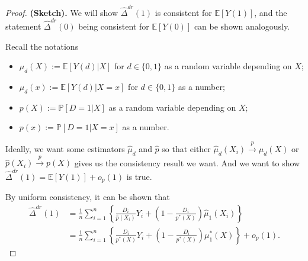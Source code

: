\documentclass[11pt,a4paper]{amsart}
\theoremstyle{plain}
\theoremstyle{definition}
\begin{document}
	\begin{proof}
		\textbf{(Sketch).} We will show $\hat{\Delta}^{dr}(1) $ is consistent for $\mathbb{E}[Y(1)]$, and the statement $\hat{\Delta}^{dr}(0) $ being consistent for $\mathbb{E}[Y(0)]$ can be shown analogously. \par 
		Recall the notations
		\begin{itemize}
			\item $\mu_{d}(X) := \mathbb{E}[Y(d) | X]$ for $d \in \{0,1\}$ as a random variable depending on $X$;
			\item $\mu_{d}(x) := \mathbb{E}[Y(d) | X=x]$ for $d \in \{0,1\}$ as a number;
			\item $p(X) := \mathbb{P}[D=1 | X]$ as a random variable depending on $X$;
			\item $p(x) := \mathbb{P}[ D=1 | X=x]$ as a number.
		\end{itemize}

		Ideally, we want some estimators $\hat{\mu}_{d}$ and $\hat{p}$ so that either $\hat{\mu}_{d}(X_{i}) \stackrel{p}{\rightarrow} \mu_{d}(X)$ or $\hat{p}(X_{i}) \stackrel{p}{\rightarrow} p(X)$ gives us the consistency result we want. And we want to show $ \hat{\Delta}^{dr}(1)  = \mathbb{E}[Y(1)] + o_{p}(1)$ is true.\par 
		By uniform consistency, it can be shown that
	\begin{equation}\label{2robust, ident}
		\begin{aligned}
		\hat{\Delta}^{dr}(1) &= \frac{1}{n}\sum_{i=1}^{n}\left\{\frac{D_{i}}{\hat{p}(X_{i})} Y_{i} + \left(1- \frac{D_{i}}{p^{*}(X)}\right) \hat{\mu}_{1}(X_{i}) \right\} \\
		&=  \frac{1}{n}\sum_{i=1}^{n}\left\{\frac{D_{i}}{p^{*}(X)} Y_{i} + \left(1- \frac{D_{i}}{p^{*}(X)}\right) \mu_{1}^{*}(X) \right\} + o_{p}(1).
		\end{aligned}
	\end{equation}
	

\end{proof}
\end{document}
